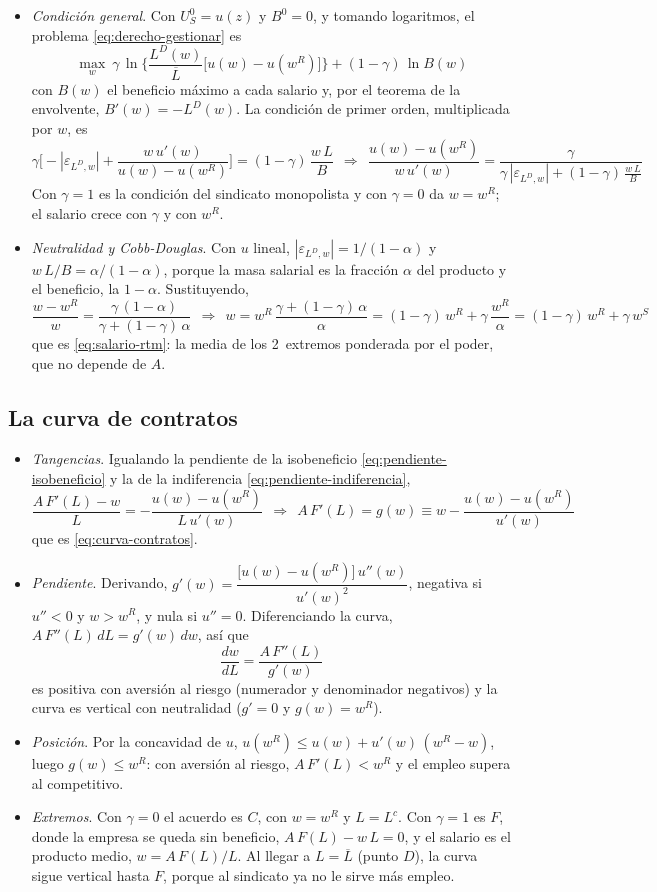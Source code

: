 \documentclass[11pt]{article}
\begin{document}
\begin{itemize}
\item \emph{Condición general}. Con $U_S^0=u(z)$ y $B^0=0$, y tomando logaritmos, el problema \eqref{eq:derecho-gestionar} es
  $$\max_{w}\ \gamma\,\ln\Big\{\frac{L^D(w)}{\overline{L}}\big[u(w)-u(w^R)\big]\Big\}+(1-\gamma)\,\ln B(w)$$
  con $B(w)$ el beneficio máximo a cada salario y, por el teorema de la envolvente, $B'(w)=-L^D(w)$. La condición de primer orden, multiplicada por $w$, es
  $$\gamma\Big[-|\varepsilon_{L^D,w}|+\frac{w\,u'(w)}{u(w)-u(w^R)}\Big]=(1-\gamma)\,\frac{w\,L}{B}\ \ \Longrightarrow\ \ \frac{u(w)-u(w^R)}{w\,u'(w)}=\frac{\gamma}{\gamma\,|\varepsilon_{L^D,w}|+(1-\gamma)\,\frac{w\,L}{B}}$$
  Con $\gamma=1$ es la condición del sindicato monopolista y con $\gamma=0$ da $w=w^R$; el salario crece con $\gamma$ y con $w^R$\nocite{Cahuc2014Labor}.\findemo
\item \emph{Neutralidad y Cobb-Douglas}. Con $u$ lineal, $|\varepsilon_{L^D,w}|=1/(1-\alpha)$ y $w\,L/B=\alpha/(1-\alpha)$, porque la masa salarial es la fracción $\alpha$ del producto y el beneficio, la $1-\alpha$. Sustituyendo,
  $$\frac{w-w^R}{w}=\frac{\gamma\,(1-\alpha)}{\gamma+(1-\gamma)\,\alpha}\ \ \Longrightarrow\ \ w=w^R\,\frac{\gamma+(1-\gamma)\,\alpha}{\alpha}=(1-\gamma)\,w^R+\gamma\,\frac{w^R}{\alpha}=(1-\gamma)\,w^R+\gamma\,w^S$$
  que es \eqref{eq:salario-rtm}: la media de los 2~extremos ponderada por el poder, que no depende de $A$.\findemo
\end{itemize}

\subsection{La curva de contratos}\label{anexo:curva-contratos}

\begin{itemize}
\item \emph{Tangencias}. Igualando la pendiente de la isobeneficio \eqref{eq:pendiente-isobeneficio} y la de la indiferencia \eqref{eq:pendiente-indiferencia},
  $$\frac{A\,F'(L)-w}{L}=-\frac{u(w)-u(w^R)}{L\,u'(w)}\ \ \Longrightarrow\ \ A\,F'(L)=g(w)\equiv w-\frac{u(w)-u(w^R)}{u'(w)}$$
  que es \eqref{eq:curva-contratos}.
\item \emph{Pendiente}. Derivando, $g'(w)=\dfrac{\big[u(w)-u(w^R)\big]\,u''(w)}{u'(w)^2}$, negativa si $u''<0$ y $w>w^R$, y nula si $u''=0$. Diferenciando la curva, $A\,F''(L)\,dL=g'(w)\,dw$, así que
  $$\frac{dw}{dL}=\frac{A\,F''(L)}{g'(w)}$$
  es positiva con aversión al riesgo (numerador y denominador negativos) y la curva es vertical con neutralidad ($g'=0$ y $g(w)=w^R$).
\item \emph{Posición}. Por la concavidad de $u$, $u(w^R)\leq u(w)+u'(w)\,(w^R-w)$, luego $g(w)\leq w^R$: con aversión al riesgo, $A\,F'(L)<w^R$ y el empleo supera al competitivo.
\item \emph{Extremos}. Con $\gamma=0$ el acuerdo es $C$, con $w=w^R$ y $L=L^c$. Con $\gamma=1$ es $F$, donde la empresa se queda sin beneficio, $A\,F(L)-w\,L=0$, y el salario es el producto medio, $w=A\,F(L)/L$. Al llegar a $L=\overline{L}$ (punto $D$), la curva sigue vertical hasta $F$, porque al sindicato ya no le sirve más empleo.\findemo
\end{itemize}
\end{document}

